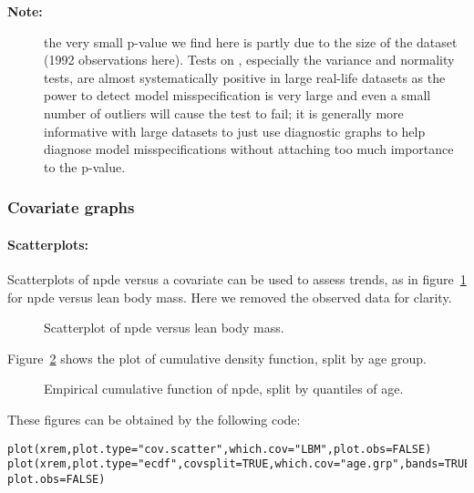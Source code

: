 \begin{description}
\item[{\bf Note:}] the very small p-value we find here is partly due to the size of the dataset (1992 observations here). Tests on \npde, especially the variance and normality tests, are almost systematically positive in large real-life datasets as the power to detect model misspecification is very large and even a small number of outliers will cause the test to fail; it is generally more informative with large datasets to just use diagnostic graphs to help diagnose model misspecifications without attaching too much importance to the p-value.
\end{description}
 
\subsubsection{Covariate graphs}

\paragraph{Scatterplots:} Scatterplots of npde versus a covariate can be used to assess trends, as in figure~\ref{fig:remi.covscatter} for npde versus lean body mass. Here we removed the observed data for clarity.

\begin{figure}[!h]
\par\kern -0.5cm
\begin{center}
\end{center}
\par\kern -0.2cm
\caption{Scatterplot of npde versus lean body mass.}\label{fig:remi.covscatter}
\end{figure}

\newpage
Figure~\ref{fig:remi.covecdf} shows the plot of cumulative density function, split by age group.
\begin{figure}[!h]
\par\kern -0.5cm
\begin{center}
\end{center}
\par\kern -0.2cm
\caption{Empirical cumulative function of npde, split by quantiles of age.} \label{fig:remi.covecdf}
\end{figure}

These figures can be obtained by the following code:
\begin{verbatim}
plot(xrem,plot.type="cov.scatter",which.cov="LBM",plot.obs=FALSE)
plot(xrem,plot.type="ecdf",covsplit=TRUE,which.cov="age.grp",bands=TRUE,
plot.obs=FALSE)
\end{verbatim} 
